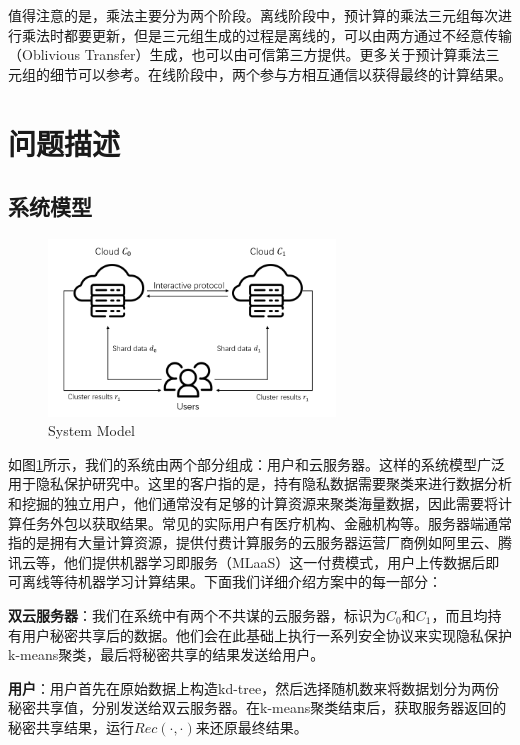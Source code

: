 值得注意的是，乘法主要分为两个阶段。离线阶段中，预计算的乘法三元组每次进行乘法时都要更新，但是三元组生成的过程是离线的，可以由两方通过不经意传输（Oblivious Transfer）生成\cite{schneider2013gmw}，也可以由可信第三方提供\cite{riazi2018chameleon}。更多关于预计算乘法三元组的细节可以参考\cite{beaver1992efficient}。在线阶段中，两个参与方相互通信以获得最终的计算结果。
\section{问题描述}
\label{s3-wenti}
\subsection{系统模型}
\begin{figure}[htbp]
	\centering
	\includegraphics[width=3in]{img/fig5.png}%
	\caption{System Model}
	\label{sys model}
\end{figure}
如图\ref{sys model}所示，我们的系统由两个部分组成：用户和云服务器。这样的系统模型广泛用于隐私保护研究中\cite{wu2020secure}\cite{bunn2007secure}。这里的客户指的是，持有隐私数据需要聚类来进行数据分析和挖掘的独立用户，他们通常没有足够的计算资源来聚类海量数据，因此需要将计算任务外包以获取结果。常见的实际用户有医疗机构、金融机构等。服务器端通常指的是拥有大量计算资源，提供付费计算服务的云服务器运营厂商例如阿里云、腾讯云等，他们提供机器学习即服务（MLaaS）这一付费模式，用户上传数据后即可离线等待机器学习计算结果。下面我们详细介绍方案中的每一部分：

\begin{compactitem}
	\item \textbf{双云服务器}：我们在系统中有两个不共谋的云服务器，标识为$ C_0 $和$ C_1 $，而且均持有用户秘密共享后的数据。他们会在此基础上执行一系列安全协议来实现隐私保护k-means聚类，最后将秘密共享的结果发送给用户。
	\item \textbf{用户}：用户首先在原始数据上构造kd-tree，然后选择随机数来将数据划分为两份秘密共享值，分别发送给双云服务器。在k-means聚类结束后，获取服务器返回的秘密共享结果，运行$ Rec(\cdot,\cdot) $来还原最终结果。
\end{compactitem}

